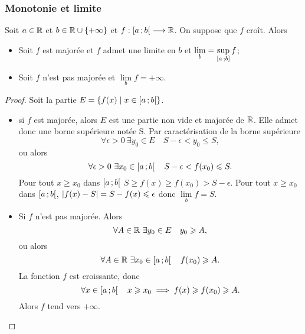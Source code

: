 \subsubsection{Monotonie et limite}

\begin{theo}
  Soit \(a \in \mathbb{R}\) et \(b \in \mathbb{R}\cup\{+\infty\}\) et \(f : \left[ a \, ;  b \right[ \longrightarrow \mathbb{R}\). On suppose que \(f\) croît. Alors
  \begin{itemize}
  \item Soit \(f\) est majorée et \(f\) admet une limite en \(b\) et \(\lim\limits_{b} = \sup\limits_{\left[ a \, ;  b \right]}f\);
  \item Soit \(f\) n'est pas majorée et \(\lim\limits_{b}f=+\infty\).
  \end{itemize}
\end{theo}
\begin{proof}
  Soit la partie \(E=\left\{f(x)\mathrel{}\middle|\mathrel{}x \in \left[ a \, ;  b \right[\right\}\).
  \begin{itemize}
  \item si \(f\) est majorée, alors \(E\) est une partie non vide et majorée de \(\mathbb{R}\). Elle admet donc une borne supérieure notée S. Par caractérisation de la borne supérieure
    \begin{equation}
      \forall \epsilon >0 \ \exists y_0 \in E \quad S-\epsilon <y_0 \leqslant S,
    \end{equation}
    ou alors
    \begin{equation}
      \forall \epsilon >0 \ \exists x_0 \in \left[ a \, ;  b \right[ \quad S-\epsilon <f(x_0) \leqslant S.
    \end{equation}
    Pour tout \(x \geqslant x_0\) dans \(\left[ a \, ;  b \right[\) \(S \geqslant f(x) \geqslant f(x_0) > S-\epsilon\). Pour tout \(x \geqslant x_0\) dans \(\left[ a \, ;  b \right[\), \(\left\lvert f(x)-S\right\rvert=S-f(x) \leqslant \epsilon\) donc \(\lim\limits_{b} f =S\).
  \item Si \(f\) n'est pas majorée. Alors
    \begin{equation}
      \forall A \in \R \ \exists y_0 \in E \quad y_0 \geqslant A,
    \end{equation}
    ou alors
    \begin{equation}
      \forall A \in \mathbb{R} \ \exists x_0 \in \left[ a \, ;  b \right[ \quad f(x_0) \geqslant A.
    \end{equation}
    La fonction \(f\) est croissante, donc
    \begin{equation}
      \forall x \in \left[ a \, ;  b \right[ \quad x \geqslant x_0 \implies f(x) \geqslant f(x_0) \geqslant A.
    \end{equation}
    Alors \(f\) tend vers \(+\infty\).
  \end{itemize}
\end{proof}

